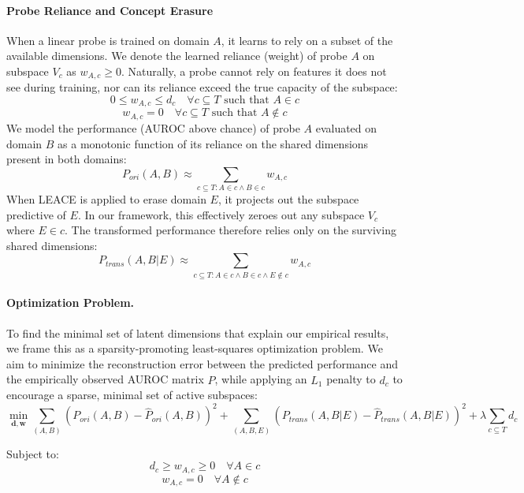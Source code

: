 \documentclass{article}
\theoremstyle{plain}
\theoremstyle{definition}
\theoremstyle{remark}
\begin{document}
\paragraph{Probe Reliance and Concept Erasure} When a linear probe is trained on domain $A$, it learns to rely on a subset of the available dimensions. We denote the learned reliance (weight) of probe $A$ on subspace $V_c$ as $w_{A, c} \ge 0$. Naturally, a probe cannot rely on features it does not see during training, nor can its reliance exceed the true capacity of the subspace:
$$0 \le w_{A, c} \le d_c \quad \forall c \subseteq T \text{ such that } A \in c$$
$$w_{A, c} = 0 \quad \forall c \subseteq T \text{ such that } A \notin c$$
We model the performance (AUROC above chance) of probe $A$ evaluated on domain $B$ as a monotonic function of its reliance on the shared dimensions present in both domains:
$$P_{ori}(A, B) \approx \sum_{c \subseteq T : A \in c \land B \in c} w_{A, c}$$
When LEACE is applied to erase domain $E$, it projects out the subspace predictive of $E$. In our framework, this effectively zeroes out any subspace $V_c$ where $E \in c$. The transformed performance therefore relies only on the surviving shared dimensions:$$P_{trans}(A, B | E) \approx \sum_{c \subseteq T : A \in c \land B \in c \land E \notin c} w_{A, c}$$

\paragraph{Optimization Problem.} 
To find the minimal set of latent dimensions that explain our empirical results, we frame this as a sparsity-promoting least-squares optimization problem. We aim to minimize the reconstruction error between the predicted performance and the empirically observed AUROC matrix $\hat{P}$, while applying an $L_1$ penalty to $d_c$ to encourage a sparse, minimal set of active subspaces:$$\min_{\mathbf{d}, \mathbf{w}} \sum_{(A, B)} \left( P_{ori}(A, B) - \hat{P}_{ori}(A, B) \right)^2 + \sum_{(A, B, E)} \left( P_{trans}(A, B | E) - \hat{P}_{trans}(A, B | E) \right)^2 + \lambda \sum_{c \subseteq T} d_c$$

Subject to:
$$d_c \ge w_{A,c} \ge 0 \quad \forall A \in c$$
$$w_{A,c} = 0 \quad \forall A \notin c$$
\end{document}
